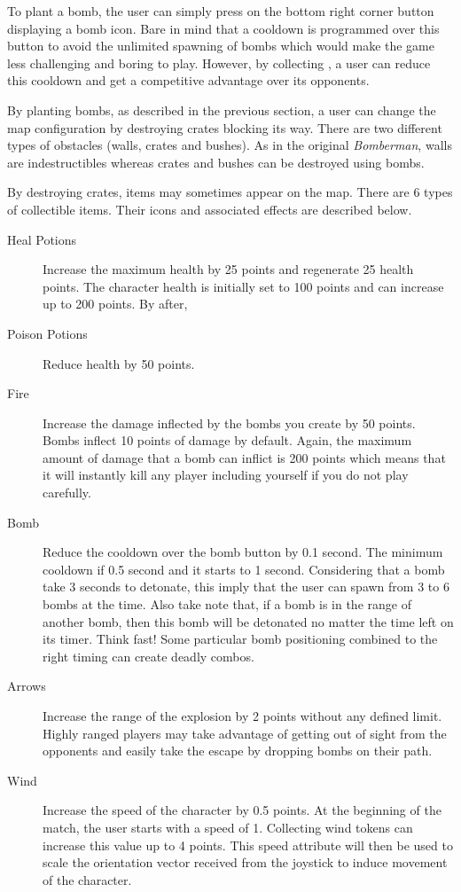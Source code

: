 To plant a bomb, the user can simply press on the bottom right corner button displaying a bomb icon. Bare in mind that a cooldown is programmed over this button to avoid the unlimited spawning of bombs which would make the game less challenging and boring to play. However, by collecting , a user can reduce this cooldown and get a competitive advantage over its opponents.

By planting bombs, as described in the previous section, a user can change the map configuration by destroying crates blocking its way. There are two different types of obstacles (walls, crates and bushes). As in the original \textit{Bomberman}, walls are indestructibles whereas crates and bushes can be destroyed using bombs.

By destroying crates, items may sometimes appear on the map. There are 6 types of collectible items. Their icons and associated effects are described below.
\begin{description}
\item [Heal Potions] Increase the maximum health by 25 points and regenerate 25 health points. The character health is initially set to 100 points and can increase up to 200 points. By after,
\item [Poison Potions] Reduce health by 50 points.
\item [Fire] Increase the damage inflected by the bombs you create by 50 points. Bombs inflect 10 points of damage by default. Again, the maximum amount of damage that a bomb can inflict is 200 points which means that it will instantly kill any player including yourself if you do not play carefully.
\item [Bomb] Reduce the cooldown over the bomb button by 0.1 second. The minimum cooldown if 0.5 second and it starts to 1 second. Considering that a bomb take 3 seconds to detonate, this imply that the user can spawn from 3 to 6 bombs at the time. Also take note that, if a bomb is in the range of another bomb, then this bomb will be detonated no matter the time left on its timer. Think fast! Some particular bomb positioning combined to the right timing can create deadly combos.
\item [Arrows] Increase the range of the explosion by 2 points without any defined limit. Highly ranged players may take advantage of getting out of sight from the opponents and easily take the escape by dropping bombs on their path.
\item [Wind] Increase the speed of the character by 0.5 points. At the beginning of the match, the user starts with a speed of 1. Collecting wind tokens can increase this value up to 4 points. This speed attribute will then be used to scale the orientation vector received from the joystick to induce movement of the character.
\end{description}
